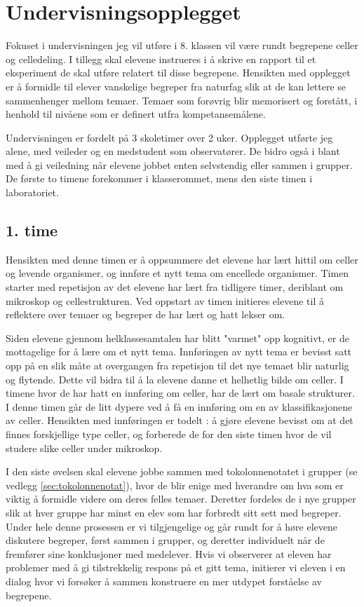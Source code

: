 \documentclass[main.tex]{subfiles}
\begin{document}
\section*{Undervisningsopplegget}
\label{sec:1}
Fokuset i undervisningen jeg vil utføre i 8. klassen vil være rundt begrepene celler og celledeling. 
I tillegg skal elevene instrueres i å skrive en rapport til et eksperiment de skal utføre relatert til disse begrepene.
Hensikten med opplegget er å formidle til elever vanskelige begreper fra naturfag slik at de kan lettere 
se sammenhenger mellom temaer. Temaer som forøvrig blir memorisert og forstått, i henhold til nivåene 
som er definert utfra kompetansemålene. 

Undervisningen er fordelt på 3 skoletimer over 2 uker. Opplegget utførte jeg alene, med veileder og en 
medstudent som observatører. De bidro også i blant med å gi veiledning når elevene jobbet enten 
selvstendig eller sammen i grupper. De første to timene forekommer i klasserommet, mens den siste timen 
i laboratoriet.

\subsection*{1. time}

Hensikten med denne timen er å oppsummere det elevene har lært hittil om celler og 
levende organismer, og innføre et nytt tema om encellede organismer. Timen starter med repetisjon 
av det elevene har lært fra tidligere timer, deriblant om mikroskop og cellestrukturen. Ved oppstart 
av timen initieres elevene til å reflektere over temaer og begreper de har lært og hatt lekser 
om.
 
Siden elevene gjennom helklassesamtalen har blitt "varmet" opp kognitivt, er de mottagelige for å 
lære om et nytt tema. Innføringen av nytt tema er bevisst satt opp på en slik måte at overgangen 
fra repetisjon til det nye temaet blir naturlig og flytende. Dette vil bidra til å la elevene danne et 
helhetlig bilde om celler. I timene hvor de har hatt en innføring om celler, har de lært om basale 
strukturer. I denne timen går de litt dypere ved å få en innføring om en av klassifikasjonene av celler.
Hensikten med innføringen er todelt : å gjøre elevene bevisst om at det finnes forskjellige type
celler, og forberede de for den siste timen hvor de vil studere slike celler under mikroskop.
 
I den siste øvelsen skal elevene jobbe sammen med tokolonnenotatet i grupper (se 
vedlegg \ref{sec:tokolonnenotat}), hvor de blir enige med hverandre om hva som er viktig å formidle videre 
om deres felles temaer. Deretter fordeles de i nye grupper slik at hver gruppe har minst en elev som har 
forbredt sitt sett med begreper. Under hele denne prosessen er vi tilgjengelige og går rundt for å 
høre elevene diskutere begreper, først sammen i grupper, og deretter individuelt når de fremfører sine 
konklusjoner med medelever. Hvis vi observerer at eleven har problemer med å gi tilstrekkelig 
respons på et gitt tema, initierer vi eleven i en dialog hvor vi forsøker å sammen konstruere en 
mer utdypet forståelse av begrepene. 
\end{document}
